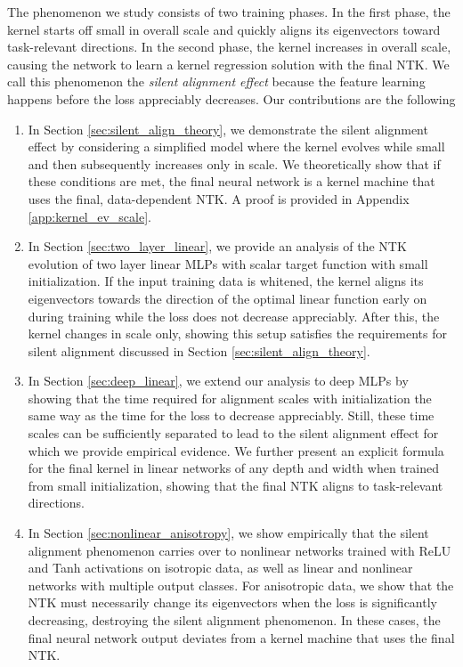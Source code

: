 \documentclass{article} %
\begin{document}
The phenomenon we study consists of two training phases. In the first phase, the kernel starts off small in overall scale and quickly aligns its eigenvectors toward task-relevant directions. In the second phase, the kernel increases in overall scale, causing the network to learn a kernel regression solution with the final NTK. We call this phenomenon the \textit{silent alignment effect} because the feature learning happens before the loss appreciably decreases. 
%
%
Our contributions are the following
\begin{enumerate}[leftmargin=*]
    \item In Section \ref{sec:silent_align_theory}, we demonstrate the silent alignment effect by considering a simplified model where the kernel evolves while small and then subsequently increases only in scale. We theoretically show that if these conditions are met, the final neural network is a kernel machine that uses the final, data-dependent NTK. A proof is provided in Appendix \ref{app:kernel_ev_scale}.
    \item In Section \ref{sec:two_layer_linear}, we provide an analysis of the NTK evolution of two layer linear MLPs with scalar target function with small initialization. If the input training data is whitened, the kernel aligns its eigenvectors towards the direction of the optimal linear function early on during training while the loss does not decrease appreciably. After this, the kernel changes in scale only, showing this setup satisfies the requirements for silent alignment discussed in Section \ref{sec:silent_align_theory}.
    \item In Section \ref{sec:deep_linear}, we extend our analysis to deep MLPs by showing that the time required for alignment scales with initialization the same way as the time for the loss to decrease appreciably. Still, these time scales can be sufficiently separated to lead to the silent alignment effect for which we provide empirical evidence. We further present an explicit formula for the final kernel in linear networks of any depth and width when trained from small initialization, showing that the final NTK aligns to task-relevant directions.
    
    \item In Section \ref{sec:nonlinear_anisotropy}, we show empirically that the silent alignment phenomenon carries over to nonlinear networks trained with ReLU and Tanh activations on isotropic data, as well as linear and nonlinear networks with multiple output classes. For anisotropic data, we show that the NTK must necessarily change its eigenvectors when the loss is significantly decreasing, destroying the silent alignment phenomenon. In these cases, the final neural network output deviates from a kernel machine that uses the final NTK.
\end{enumerate}
\end{document}
